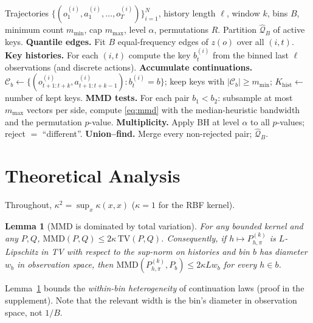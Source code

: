 \documentclass[10pt]{article}
\newtheorem{lemma}{Lemma}
\newcommand{\calQ}{\mathcal{Q}}
\newcommand{\calC}{\mathcal{C}}
\newcommand{\mmd}{\mathrm{MMD}}
\newcommand{\TV}{\mathrm{TV}}
\newcommand{\Khist}{K_{\mathrm{hist}}}
\begin{document}
\begin{algorithm}[t]
\caption{\textsc{ContinuousQuotientEstimator}}
\label{alg:cqe}
\begin{algorithmic}[1]
\Require Trajectories $\{(o^{(i)}_1,a^{(i)}_1,\dots,o^{(i)}_T)\}_{i=1}^N$,
         history length $\ell$, window $k$, bins $B$, minimum count $m_{\min}$,
         cap $m_{\max}$, level $\alpha$, permutations $R$.
\Ensure  Partition $\widehat{\calQ}_B$ of active keys.
\State \textbf{Quantile edges.}  Fit $B$ equal-frequency edges of $z(o)$ over all $(i,t)$.
\State \textbf{Key histories.}  For each $(i,t)$ compute the key $b^{(i)}_t$ from the
       binned last $\ell$ observations (and discrete actions).
\State \textbf{Accumulate continuations.}  $\calC_b\leftarrow\{(o^{(i)}_{t+1:t+k},a^{(i)}_{t+1:t+k-1}):b^{(i)}_t=b\}$;
       keep keys with $|\calC_b|\ge m_{\min}$; $\Khist\leftarrow$ number of kept keys.
\State \textbf{MMD tests.}  For each pair $b_1<b_2$: subsample at most $m_{\max}$ vectors per side,
       compute \eqref{eq:mmd} with the median-heuristic bandwidth and the permutation $p$-value.
\State \textbf{Multiplicity.}  Apply BH at level $\alpha$ to all $p$-values; reject $=$ ``different''.
\State \textbf{Union--find.}  Merge every non-rejected pair; \Return $\widehat{\calQ}_B$.
\end{algorithmic}
\end{algorithm}

\section{Theoretical Analysis}
\label{sec:theory}

Throughout, $\kappa^2=\sup_x\kappa(x,x)$ ($\kappa=1$ for the RBF kernel).

\begin{lemma}[MMD is dominated by total variation]
\label{lem:tv}
For any bounded kernel and any $P,Q$, $\mmd(P,Q)\le2\kappa\,\TV(P,Q)$.
Consequently, if $h\mapsto P^{(k)}_{h,\pi}$ is $L$-Lipschitz in TV with respect
to the sup-norm on histories and bin $b$ has diameter $w_b$ in observation
space, then $\mmd(P^{(k)}_{h,\pi},P_b)\le2\kappa Lw_b$ for every $h\in b$.
\end{lemma}

Lemma~\ref{lem:tv} bounds the \emph{within-bin heterogeneity} of continuation
laws (proof in the supplement).  Note that the relevant width is the bin's
diameter in observation space, not $1/B$.
\end{document}
